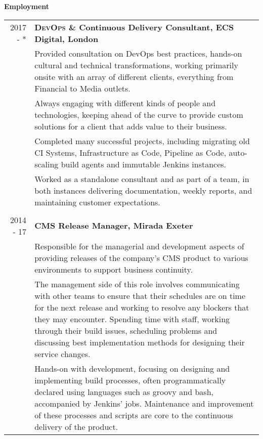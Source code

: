 \documentclass[a4paper,12pt,final,sans]{memoir}
\begin{document}
\textbf{\textsf{\color{head} \large{Employment}}} \\[-0.8em]

\begin{longtable}{r p{16cm}}
2017 - * \space & \textbf{\textsf{\color{head} \textsc{DevOps} \& Continuous Delivery Consultant, \textsc{ECS} Digital, London}}\\[0.3em]
& Provided consultation on DevOps best practices, hands-on cultural and technical transformations, working primarily onsite with an array of different clients, everything from Financial to Media outlets. \\[0.4em]

& Always engaging with different kinds of people and technologies, keeping ahead of the curve to provide custom solutions for a client that adds value to their business. \\[0.4em]

& Completed many successful projects, including migrating old CI Systems, Infrastructure as Code, Pipeline as Code, auto-scaling build agents and immutable Jenkins instances. \\[0.4em]

& Worked as a standalone consultant and as part of a team, in both instances delivering documentation, weekly reports, and maintaining customer expectations. \\[0.4em]
\\[0.5em]
\pagebreak

2014 - 17 & \textbf{\textsf{\color{head} \textsc{CMS} Release Manager, Mirada Exeter}}\\[0.3em]
	& Responsible for the managerial and development aspects of providing releases of the company's CMS product to various environments to support business continuity.  \\[0.4em]

	& The management side of this role involves communicating with other teams to ensure that their schedules are on time for the next release and working to resolve any blockers that they may encounter. Spending time with staff, working through their build issues, scheduling problems and discussing best implementation methods for designing their service changes.  \\[0.4em]

	& Hands-on with development, focusing on designing and implementing build processes, often programmatically declared using languages such as groovy and bash, accompanied by Jenkins’ jobs. Maintenance and improvement of these processes and scripts are core to the continuous delivery of the product. \\[0.4em]


\end{longtable}
\end{document}
